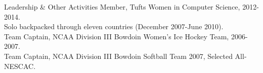 \documentclass{resume} %
\begin{document}
\begin{rSection}{Leadership \& Other Activities}
Member, Tufts Women in Computer Science, 2012-2014. \\
Solo backpacked through eleven countries (December 2007-June 2010). \\
Team Captain, NCAA Division III Bowdoin Women's Ice Hockey Team, 2006-2007.\\
Team Captain, NCAA Division III Bowdoin Softball Team 2007, Selected All-NESCAC.\\
\end{rSection}








\end{document}
